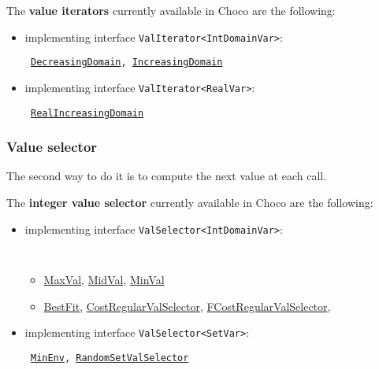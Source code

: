 \noindent The \textbf{value iterators} currently available in Choco are the following: 
\begin{itemize}
\item implementing interface \texttt{ValIterator<IntDomainVar>}:
\begin{notedef}\tt
\hyperlink{decreasingdomain:decreasingdomainvaliterator}{DecreasingDomain}, \hyperlink{increasingdomain:increasingdomainvaliterator}{IncreasingDomain}
\end{notedef}
\item implementing interface \texttt{ValIterator<RealVar>}:
\begin{notedef}\tt
\hyperlink{realincreasingdomain:realincreasingdomainvaliterator}{RealIncreasingDomain}
\end{notedef}
\end{itemize}

\subsubsection{Value selector}\label{solver:valueselector}\hypertarget{solver:valueselector}{}
The second way to do it is to compute the next value at each call.

\noindent The \textbf{integer value selector} currently available in Choco are the following: 
\begin{itemize}
\item implementing interface \texttt{ValSelector<IntDomainVar>}:
\begin{notedef}\tt
  \begin{itemize}
  \item \hyperlink{maxval:maxvalvalselector}{MaxVal}, \hyperlink{midval:midvalvalselector}{MidVal}, \hyperlink{minval:minvalvalselector}{MinVal}
  \item \hyperlink{bestfit:bestfitvalselector}{BestFit}, \hyperlink{costregularvalselector:costregularvalselectorvalselector}{CostRegularValSelector}, \hyperlink{fcostregularvalselector:fcostregularvalselectorvalselector}{FCostRegularValSelector}, %
  \end{itemize}
\end{notedef}
\item implementing interface \texttt{ValSelector<SetVar>}:
  \begin{notedef}\tt
\hyperlink{minenv:minenvvalselector}{MinEnv}, \hyperlink{randomsetvalselector:randomsetvalselectorvalselector}{RandomSetValSelector}
\end{notedef}
\end{itemize}



